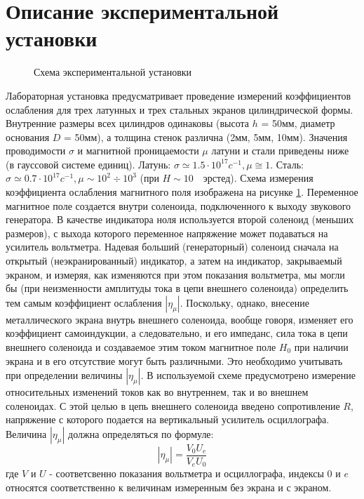 \documentclass[a4paper,12pt]{article}
\begin{document}
\section{Описание экспериментальной установки}
\begin{figure}[h]
	\centering
	\caption{Схема экспериментальной установки}
	\label{fig:figure1}
\end{figure}
Лабораторная установка предусматривает проведение измерений коэффициентов ослабления для трех латунных и трех стальных экранов цилиндрической формы. Внутренние размеры всех цилиндров одинаковы (высота $h$ = 50мм, диаметр основания $D$ = 50мм), а толщина стенок различна (2мм, 5мм, 10мм). Значения проводимости $\sigma$ и магнитной проницаемости $\mu$ латуни и стали приведены ниже (в гауссовой системе единиц).
Латунь: $\sigma \simeq 1.5\cdot 10^{17} c^{-1}, \mu \cong 1$.
Сталь: $\sigma \simeq 0.7\cdot 10^{17} c^{-1}, \mu \sim 10^2 \div 10^3 $ (при $H \sim 10\text{ }$ эрстед).
Схема измерения коэффициента ослабления магнитного поля изображена на рисунке \ref{fig:figure1}. Переменное магнитное поле создается внутри соленоида, подключенного к выходу звукового генератора. В качестве индикатора ноля используется второй соленоид (меньших размеров), с выхода которого переменное напряжение может подаваться на усилитель вольтметра. Надевая больший (генераторный) соленоид сначала на открытый (неэкранированный) индикатор, а затем на индикатор, закрываемый экраном, и измеряя, как изменяются при этом показания вольтметра, мы могли бы (при неизменности амплитуды тока в цепи внешнего соленоида) определить тем самым коэффициент ослабления $|\eta_{\mu}|$. Поскольку, однако, внесение металлического экрана внутрь внешнего соленоида, вообще говоря, изменяет его коэффициент самоиндукции, а следовательно, и его импеданс, сила тока в цепи внешнего соленоида и создаваемое этим током магнитное поле $H_0$ при наличии экрана и в его отсутствие могут быть различными. Это необходимо учитывать при определении величины $|\eta_{\mu}|$. В используемой схеме предусмотрено измерение относительных изменений токов как во внутреннем, так и во внешнем соленоидах. С этой целью в цепь внешнего соленоида введено сопротивление $R$, напряжение с которого подается на вертикальный усилитель осциллографа. Величина $|\eta_{\mu}|$ должна определяться по формуле:
\begin{equation}
	|\eta_{\mu}|=\frac{V_0U_e}{V_eU_0}
\label{eq:7}
\end{equation}
где $V$ и $U$ - соответсвенно показания вольтметра и осциллографа, индексы $0$ и $e$ относятся соответственно к величинам измеренным без экрана и с экраном.
\end{document}
